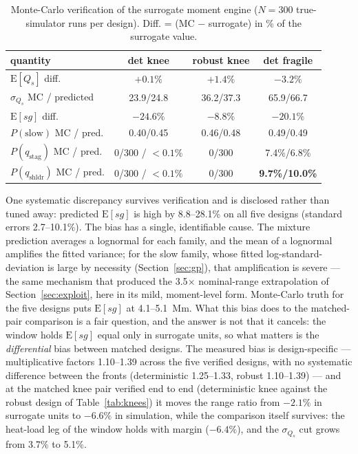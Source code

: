 \begin{table}[htbp]
\centering
\caption{Monte-Carlo verification of the surrogate moment engine
  ($N=300$ true-simulator runs per design). Diff. = (MC $-$ surrogate)
  in \% of the surrogate value.}
\label{tab:verify}
\begin{tabular}{lccc}
\toprule
quantity & det knee & robust knee & det fragile \\
\midrule
$\mathrm{E}[Q_s]$ diff.        & $+0.1\%$  & $+1.4\%$  & $-3.2\%$ \\
$\sigma_{Q_s}$ MC / predicted  & 23.9/24.8 & 36.2/37.3 & 65.9/66.7 \\
$\mathrm{E}[sg]$ diff.         & $-24.6\%$ & $-8.8\%$  & $-20.1\%$ \\
$P(\mathrm{slow})$ MC / pred.  & 0.40/0.45 & 0.46/0.48 & 0.49/0.49 \\
$P(q_{\mathrm{stag}})$ MC / pred. & 0/300 / $<0.1\%$ & 0/300 & 7.4\%/6.8\% \\
$P(q_{\mathrm{shldr}})$ MC / pred. & 0/300 / $<0.1\%$ & 0/300 & \textbf{9.7\%/10.0\%} \\
\bottomrule
\end{tabular}
\end{table}

One systematic discrepancy survives verification and is disclosed rather
than tuned away: predicted $\mathrm{E}[sg]$ is high by 8.8--28.1\% on all
five designs (standard errors 2.7--10.1\%). The bias has a single,
identifiable cause. The mixture prediction averages a lognormal for each
family, and the mean of a lognormal amplifies the fitted variance; for the
slow family, whose fitted log-standard-deviation is large by necessity
(Section~\ref{sec:gp}), that amplification is severe --- the same mechanism
that produced the 3.5$\times$ nominal-range extrapolation of
Section~\ref{sec:exploit}, here in its mild, moment-level form. Monte-Carlo
truth for the five designs puts $\mathrm{E}[sg]$ at 4.1--5.1~Mm. What
this bias does to the matched-pair comparison is a fair question, and
the answer is not that it cancels: the window holds $\mathrm{E}[sg]$
equal only in surrogate units, so what matters is the
\emph{differential} bias between matched designs. The measured bias is
design-specific --- multiplicative factors 1.10--1.39 across the five
verified designs, with no systematic difference between the fronts
(deterministic 1.25--1.33, robust 1.10--1.39) --- and at the
matched knee pair verified end to end (deterministic knee against the
robust design of Table~\ref{tab:knees}) it moves the range
ratio from $-2.1\%$ in surrogate units to $-6.6\%$ in simulation, while
the comparison itself survives: the heat-load leg of the window holds
with margin ($-6.4\%$), and the $\sigma_{Q_s}$ cut grows from 3.7\% to
5.1\%.

